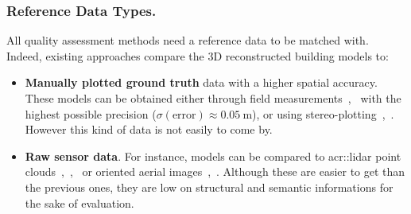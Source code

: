 \documentclass[runningheads]{llncs}
\begin{document}
\subsubsection{Reference Data Types.}
All quality assessment methods need a reference data to be matched with. Indeed, existing approaches compare the 3D reconstructed building models to:
\begin{itemize}
    \item \textbf{Manually plotted ground truth} data with a higher spatial accuracy. These models can be obtained either through field measurements~\cite{Kaartinen2005},~\cite{Voegtle2003} with the highest possible precision ($\sigma(\text{error}) \approx \SI{0.05}{\meter}$), or using stereo-plotting~\cite{Kaartinen2005},~\cite{Zeng2014}. However this kind of data is not easily to come by.
    \item \textbf{Raw sensor data}. For instance, models can be compared to \acrfull{acr::lidar} point clouds~\cite{Akca2010},~\cite{Lafarge2012},~\cite{li2016boxfitting} or oriented aerial images~\cite{boudet2006supervised},~\cite{Michelin2013}. Although these are easier to get than the previous ones, they are low on structural and semantic informations for the sake of evaluation.
\end{itemize}
\end{document}
